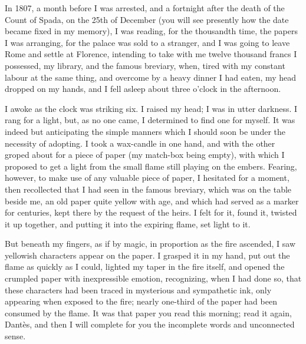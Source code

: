 {In 1807, a month before I was arrested, and a fortnight after the death of the Count of Spada, on the 25th of December (you will see presently how the date became fixed in my memory), I was reading, for the thousandth time, the papers I was arranging, for the palace was sold to a stranger, and I was going to leave Rome and settle at Florence, intending to take with me twelve thousand francs I possessed, my library, and the famous breviary, when, tired with my constant labour at the same thing, and overcome by a heavy dinner I had eaten, my head dropped on my hands, and I fell asleep about three o'clock in the afternoon.  

I awoke as the clock was striking six. I raised my head; I was in utter darkness. I rang for a light, but, as no one came, I determined to find one for myself. It was indeed but anticipating the simple manners which I should soon be under the necessity of adopting. I took a wax-candle in one hand, and with the other groped about for a piece of paper (my match-box being empty), with which I proposed to get a light from the small flame still playing on the embers. Fearing, however, to make use of any valuable piece of paper, I hesitated for a moment, then recollected that I had seen in the famous breviary, which was on the table beside me, an old paper quite yellow with age, and which had served as a marker for centuries, kept there by the request of the heirs. I felt for it, found it, twisted it up together, and putting it into the expiring flame, set light to it. 

But beneath my fingers, as if by magic, in proportion as the fire ascended, I saw yellowish characters appear on the paper. I grasped it in my hand, put out the flame as quickly as I could, lighted my taper in the fire itself, and opened the crumpled paper with inexpressible emotion, recognizing, when I had done so, that these characters had been traced in mysterious and sympathetic ink, only appearing when exposed to the fire; nearly one-third of the paper had been consumed by the flame. It was that paper you read this morning; read it again, Dantès, and then I will complete for you the incomplete words and unconnected sense.} 

